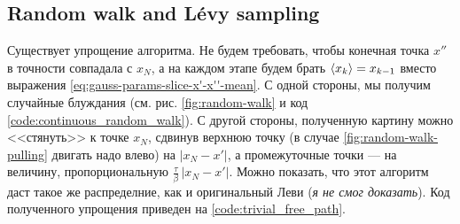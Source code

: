 \begin{lecture}

    \subsection{Random walk and Lévy sampling}
    Существует упрощение алгоритма.
    Не будем требовать, чтобы конечная точка $x''$ в точности совпадала с $x_N$, а на каждом этапе будем брать $\braket{x_k} = x_{k-1}$ вместо выражения \eqref{eq:gauss-params-slice-x'-x''-mean}.
    С одной стороны, мы получим случайные блуждания (см. рис. \ref{fig:random-walk} и код \ref{code:continuous_random_walk}).
    С другой стороны, полученную картину можно <<стянуть>> к точке $x_N$, сдвинув верхнюю точку (в случае \ref{fig:random-walk-pulling} двигать надо влево) на $| x_N - x' |$, а промежуточные точки --- на величину, пропорциональную $\frac{\tau}{\beta}\,|x_N - x'|$.
    Можно показать, что этот алгоритм даст такое же распределние, как и оригинальный Леви (\textit{я не смог доказать}).
    Код полученного упрощения приведен на \ref{code:trivial_free_path}.


\end{lecture}
